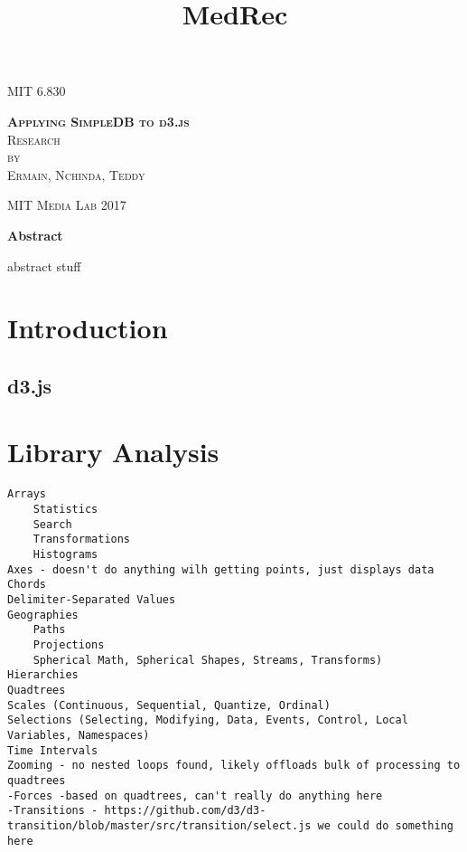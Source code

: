 \documentclass[a4paper]{article}
\begin{document}
\title{MedRec}

\begin{titlepage}
\begin{center}

\textsc{\Large MIT 6.830}\\[4em]

\vspace{4em}

\textsc{\huge \textbf{Applying SimpleDB to d3.js}}\\[4em]

\textsc{\large Research}\\[1em]

\textsc{by}\\[1em]

\textsc{\Large Ermain, Nchinda, Teddy}\\[1em]

\end{center}

\vspace*{\fill}
\textsc{MIT Media Lab\hspace*{\fill} 2017}

\end{titlepage}
\begin{center}
{\large\bf{Abstract\\}}
\end{center}
abstract stuff
\tableofcontents\label{c}
\newpage


\section{Introduction} \label{overview}%
\subsection{d3.js}
\section{Library Analysis}
\begin{verbatim}
Arrays
	Statistics
	Search
	Transformations
	Histograms
Axes - doesn't do anything wilh getting points, just displays data
Chords
Delimiter-Separated Values
Geographies 
	Paths
	Projections
	Spherical Math, Spherical Shapes, Streams, Transforms)
Hierarchies
Quadtrees
Scales (Continuous, Sequential, Quantize, Ordinal)
Selections (Selecting, Modifying, Data, Events, Control, Local Variables, Namespaces)
Time Intervals
Zooming - no nested loops found, likely offloads bulk of processing to quadtrees
-Forces -based on quadtrees, can't really do anything here
-Transitions - https://github.com/d3/d3-transition/blob/master/src/transition/select.js we could do something here
\end{verbatim}
\end{document}
